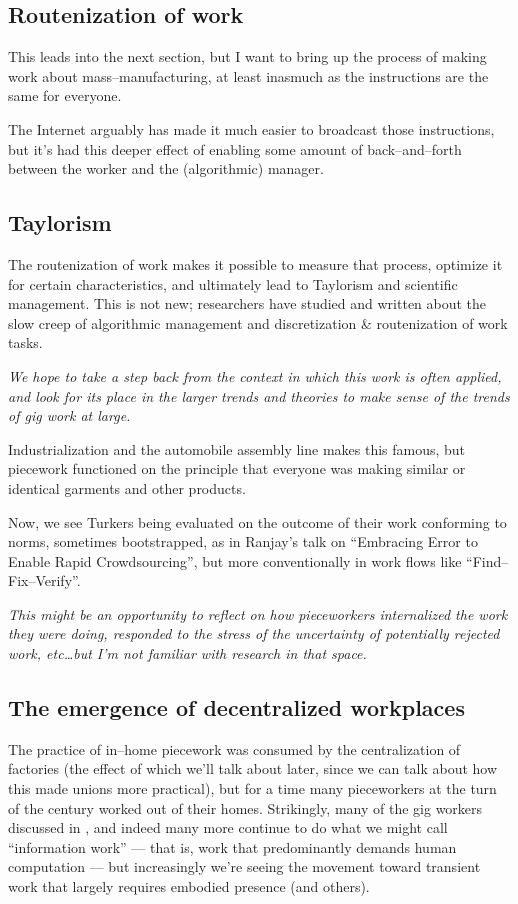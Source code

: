 \documentclass{sigchi}
\begin{document}
\subsection{Routenization of work}
This leads into the next section, but I want to bring up the process of
making work about mass--manufacturing, at least inasmuch as
the instructions are the same for everyone.

The Internet arguably has made it much easier to broadcast those instructions,
but it's had this deeper effect of enabling some amount of back--and--forth
between the worker and the (algorithmic) manager.

\subsection{Taylorism}
The routenization of work makes it possible to measure that process,
optimize it for certain characteristics, and ultimately
lead to Taylorism and scientific management.
This is not new;
researchers have studied and written about the slow creep of
algorithmic management and 
discretization \& routenization of work tasks.

\textit{We hope to take a step back from the context in which this work is often applied, and
look for its place in the larger trends and theories
to make sense of the trends of gig work at large.}

Industrialization and the automobile assembly line makes this famous,
but piecework functioned on the principle that everyone was making similar
or identical
garments and other products.

Now, we see Turkers being evaluated on the outcome of their work conforming to norms,
sometimes bootstrapped,
as in Ranjay's talk on 
``Embracing Error to Enable Rapid Crowdsourcing'',
but more conventionally in work flows like ``Find--Fix--Verify''.

\textit{This might be an opportunity to reflect on
how pieceworkers internalized the work they were doing,
responded to the stress of the uncertainty of potentially rejected work,
etc\dots but I'm not familiar with research in that space.}

\subsection{The emergence of decentralized workplaces}
The practice of in--home piecework was consumed by
the centralization of factories
(the effect of which we'll talk about later, since
we can talk about how this made unions more practical),
but for a time many pieceworkers
at the turn of the  century
worked out of their homes.
Strikingly, many of the gig workers
\citeauthor{crowdworkFuture}
discussed in
\citeyear{crowdworkFuture},
and indeed many more continue to do what we might call ``information work''
--- that is, work that predominantly demands human computation ---
but increasingly we're seeing the movement toward transient work that largely requires embodied presence
\cite{uberAlgorithm} (and others).
\end{document}

